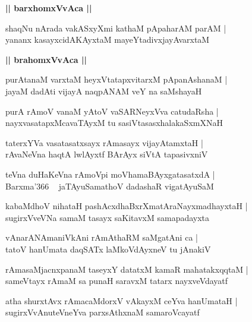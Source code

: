 \documentclass[twoside,12pt,openright]{book}
\newcounter{shloka}[chapter]
\def\uvaca#1{\centerline{{\large\textbf{#1}}}}
\begin{document}
\uvaca{|| barxhomxVvAca ||}

\begin{shloka}%
shaqNu nArada vakASxyXmi kathaM pApaharAM parAM |\\
yananx kasayxcidAKAyxtaM mayeYtadivxjayAvarxtaM
\end{shloka}

\uvaca{|| brahomxVvAca ||}

\begin{shloka}%
purAtanaM varxtaM heyxVtatapxvitarxM pApanAshanaM |\\
jayaM dadAti vijayA naqpANAM veY na saMshayaH 
\end{shloka}

\begin{shloka}%
purA rAmoV vanaM yAtoV vaSARNeyxVva catudaRsha |\\
nayxvasatapxMcavaTAyxM tu sasiVtasasxhalakaSxmXNaH 
\end{shloka}

\begin{shloka}%
taterxYVa vasatasatxsayx rAmasayx vijayAtamxtaH |\\
rAvaNeVna haqtA lwlAyxtf  BArAyx siVtA tapasivxniV 
\end{shloka}

\begin{shloka}%
teVna duHaKeVna rAmoVpi moVhamaBAyxgatasatxdA |\\
Barxma\char'366 ~ jaTAyuSamathoV dadashaR vigatAyuSaM
\end{shloka}

\begin{shloka}%
kabaMdhoV nihataH pashAcxdhaBxrXmatAraNayxmadhayxtaH |\\
sugirxVveVNa samaM tasayx saKitavxM samapadayxta  
\end{shloka}

\begin{shloka}%
vAnarANAmaniVkAni rAmAthaRM saMgatAni ca |\\
tatoV hanUmata daqSATx laMkoVdAyxneV tu jAnakiV 
\end{shloka}

\begin{shloka}%
rAmasaMjacnxpanaM taseyxY datatxM kamaR mahatakxqqtaM |\\
sameVtayx rAmaM sa punaH saravxM tatarx nayxveVdayatf
\end{shloka}

\begin{shloka}%
atha shurxtAvx rAmacaMdorxV vAkayxM ceYva hanUmataH |\\
sugirxVvAnuteVneYva parxsAthxnaM samaroVcayatf
\end{shloka}
\end{document}
